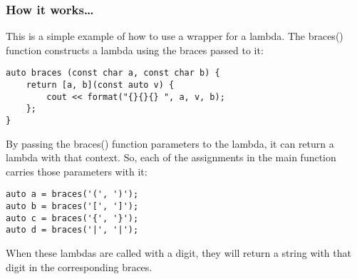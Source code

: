 \subsubsection{How it works…}

This is a simple example of how to use a wrapper for a lambda. The braces() function constructs a lambda using the braces passed to it:

\begin{lstlisting}[style=styleCXX]
auto braces (const char a, const char b) {
	return [a, b](const auto v) {
		cout << format("{}{}{} ", a, v, b);
	};
}
\end{lstlisting}

By passing the braces() function parameters to the lambda, it can return a lambda with that context. So, each of the assignments in the main function carries those parameters with it:

\begin{lstlisting}[style=styleCXX]
auto a = braces('(', ')');
auto b = braces('[', ']');
auto c = braces('{', '}');
auto d = braces('|', '|');
\end{lstlisting}

When these lambdas are called with a digit, they will return a string with that digit in the corresponding braces.









